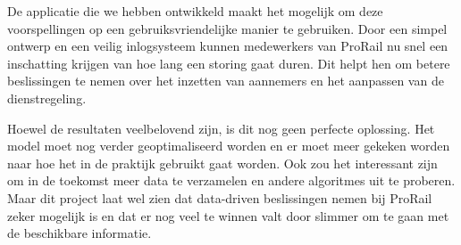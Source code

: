 \documentclass{article}
\begin{document}
De applicatie die we hebben ontwikkeld maakt het mogelijk om deze voorspellingen op een gebruiksvriendelijke manier te gebruiken. Door een simpel ontwerp en een veilig inlogsysteem kunnen medewerkers van ProRail nu snel een inschatting krijgen van hoe lang een storing gaat duren. Dit helpt hen om betere beslissingen te nemen over het inzetten van aannemers en het aanpassen van de dienstregeling.

Hoewel de resultaten veelbelovend zijn, is dit nog geen perfecte oplossing. Het model moet nog verder geoptimaliseerd worden en er moet meer gekeken worden naar hoe het in de praktijk gebruikt gaat worden. Ook zou het interessant zijn om in de toekomst meer data te verzamelen en andere algoritmes uit te proberen. Maar dit project laat wel zien dat data-driven beslissingen nemen bij ProRail zeker mogelijk is en dat er nog veel te winnen valt door slimmer om te gaan met de beschikbare informatie.
\end{document}
